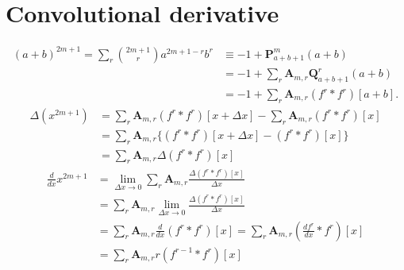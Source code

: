 \documentclass[12pt, letterpaper]{amsart}
\theoremstyle{definition}
\theoremstyle{remark}
\numberwithin{equation}{section}
\begin{document}
\section{Convolutional derivative}
\begin{equation*}
\begin{split}
(a+b)^{2m+1}=\sum_{r} \binom{2m+1}{r} a^{2m+1-r} b^r
&\equiv -1+\mathbf{P}^{m}_{a+b+1}(a+b) \\
&= -1+\sum_{r}\mathbf{A}_{m,r}\mathbf{Q}^{r}_{a+b+1}(a+b)\\
&= -1+\sum\limits_{r}\mathbf{A}_{m,r} (f^{r} \ast f^{r})[a+b].
\end{split}
\end{equation*}
\begin{equation*}
\begin{split}
\Delta(x^{2m+1})
&=\sum\limits_{r}\mathbf{A}_{m,r} (f^{r} \ast f^{r})[x+\Delta x]-\sum\limits_{r}\mathbf{A}_{m,r} (f^{r} \ast f^{r})[x] \\
&=\sum\limits_{r}\mathbf{A}_{m,r} \{(f^{r} \ast f^{r})[x+\Delta x] - (f^{r} \ast f^{r})[x]\} \\
&=\sum\limits_{r}\mathbf{A}_{m,r} \Delta (f^{r} \ast f^{r})[x]
\end{split}
\end{equation*}
\begin{equation*}
\begin{split}
\frac{d}{dx}x^{2m+1}
&=\lim\limits_{\Delta x\to0} \sum\limits_{r}\mathbf{A}_{m,r} \frac{\Delta (f^{r} \ast f^{r})[x]}{\Delta x} \\
&=\sum\limits_{r}\mathbf{A}_{m,r} \lim\limits_{\Delta x\to0}\frac{\Delta (f^{r} \ast f^{r})[x]}{\Delta x} \\
&=\sum\limits_{r}\mathbf{A}_{m,r} \frac{d}{dx} (f^{r} \ast f^{r})[x]=\sum\limits_{r}\mathbf{A}_{m,r} (\tfrac{df^{r}}{dx} \ast f^{r})[x]\\
&=\sum\limits_{r}\mathbf{A}_{m,r} r(f^{r-1} \ast f^{r})[x]
\end{split}
\end{equation*}
\end{document}
